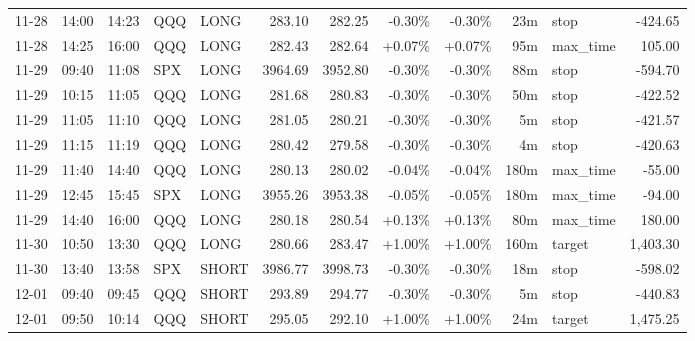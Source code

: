 \documentclass[11pt,a4paper,twoside]{article}
\begin{document}
\begin{center}
\begin{longtable}{>{\color{txtmain}}l l l l l r r r r r >{\color{txtmain}}l r}
11-28 & 14:00 & 14:23 & QQQ & LONG & 283.10 & 282.25 & \textcolor{lossred}{-0.30\%} & \textcolor{lossred}{-0.30\%} & 23m & stop & \textcolor{lossred}{-424.65} \\
11-28 & 14:25 & 16:00 & QQQ & LONG & 282.43 & 282.64 & \textcolor{wingreen}{+0.07\%} & \textcolor{wingreen}{+0.07\%} & 95m & max\_time & \textcolor{wingreen}{105.00} \\
11-29 & 09:40 & 11:08 & SPX & LONG & 3964.69 & 3952.80 & \textcolor{lossred}{-0.30\%} & \textcolor{lossred}{-0.30\%} & 88m & stop & \textcolor{lossred}{-594.70} \\
11-29 & 10:15 & 11:05 & QQQ & LONG & 281.68 & 280.83 & \textcolor{lossred}{-0.30\%} & \textcolor{lossred}{-0.30\%} & 50m & stop & \textcolor{lossred}{-422.52} \\
11-29 & 11:05 & 11:10 & QQQ & LONG & 281.05 & 280.21 & \textcolor{lossred}{-0.30\%} & \textcolor{lossred}{-0.30\%} & 5m & stop & \textcolor{lossred}{-421.57} \\
11-29 & 11:15 & 11:19 & QQQ & LONG & 280.42 & 279.58 & \textcolor{lossred}{-0.30\%} & \textcolor{lossred}{-0.30\%} & 4m & stop & \textcolor{lossred}{-420.63} \\
11-29 & 11:40 & 14:40 & QQQ & LONG & 280.13 & 280.02 & \textcolor{lossred}{-0.04\%} & \textcolor{lossred}{-0.04\%} & 180m & max\_time & \textcolor{lossred}{-55.00} \\
11-29 & 12:45 & 15:45 & SPX & LONG & 3955.26 & 3953.38 & \textcolor{lossred}{-0.05\%} & \textcolor{lossred}{-0.05\%} & 180m & max\_time & \textcolor{lossred}{-94.00} \\
11-29 & 14:40 & 16:00 & QQQ & LONG & 280.18 & 280.54 & \textcolor{wingreen}{+0.13\%} & \textcolor{wingreen}{+0.13\%} & 80m & max\_time & \textcolor{wingreen}{180.00} \\
11-30 & 10:50 & 13:30 & QQQ & LONG & 280.66 & 283.47 & \textcolor{wingreen}{+1.00\%} & \textcolor{wingreen}{+1.00\%} & 160m & target & \textcolor{wingreen}{1,403.30} \\
11-30 & 13:40 & 13:58 & SPX & SHORT & 3986.77 & 3998.73 & \textcolor{lossred}{-0.30\%} & \textcolor{lossred}{-0.30\%} & 18m & stop & \textcolor{lossred}{-598.02} \\
12-01 & 09:40 & 09:45 & QQQ & SHORT & 293.89 & 294.77 & \textcolor{lossred}{-0.30\%} & \textcolor{lossred}{-0.30\%} & 5m & stop & \textcolor{lossred}{-440.83} \\
12-01 & 09:50 & 10:14 & QQQ & SHORT & 295.05 & 292.10 & \textcolor{wingreen}{+1.00\%} & \textcolor{wingreen}{+1.00\%} & 24m & target & \textcolor{wingreen}{1,475.25} \\

\end{longtable}
\end{center}
\end{document}
